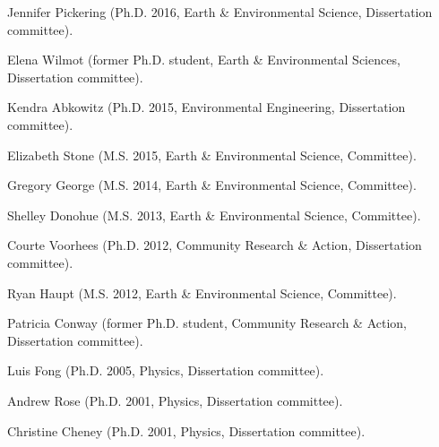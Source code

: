 \item Jennifer Pickering (Ph.D. 2016, Earth \& Environmental Science, Dissertation committee).
\item Elena Wilmot (former Ph.D. student, Earth \& Environmental Sciences, Dissertation committee).
\item Kendra Abkowitz (Ph.D. 2015, Environmental Engineering, Dissertation committee).
\item Elizabeth Stone (M.S. 2015, Earth \& Environmental Science, Committee).
\item Gregory George (M.S. 2014, Earth \& Environmental Science, Committee).
\item Shelley Donohue (M.S. 2013, Earth \& Environmental Science, Committee).
\item Courte Voorhees (Ph.D. 2012,  Community Research \& Action, Dissertation committee).
\item Ryan Haupt (M.S. 2012, Earth \& Environmental Science, Committee).
\item Patricia Conway (former Ph.D. student, Community Research \& Action, Dissertation committee).
\item Luis Fong (Ph.D. 2005, Physics, Dissertation committee).
\item Andrew Rose (Ph.D. 2001, Physics, Dissertation committee).
\item Christine Cheney (Ph.D. 2001, Physics, Dissertation committee).
